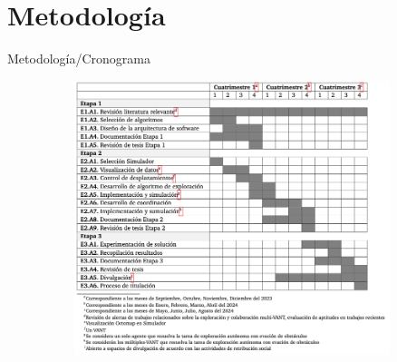\documentclass[
  24pt, %
  aspectratio=169, %
]{beamer}
\begin{document}
\section{Metodología}
\begin{frame}{Metodología/Cronograma}
  \begin{figure}
    \centering
    \includegraphics[width=11cm, height=8cm]{cronograma}
  \end{figure}
\end{frame}
\end{document}
